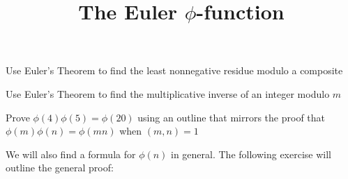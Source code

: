\documentclass{ximera}
\title{The Euler $\phi$-function}
\begin{document}
\begin{abstract}
\end{abstract}
\maketitle


\begin{obj}
\item Use Euler's Theorem to find the least nonnegative residue modulo a composite
\item Use Euler's Theorem to find the multiplicative inverse of an integer modulo $m$
\item Prove $\phi(4)\phi(5)=\phi(20)$ using an outline that mirrors the proof that $\phi(m)\phi(n)=\phi(mn)$ when $(m,n)=1$
\end{obj}


We will also find a formula for $\phi(n)$ in general. The following exercise will outline the general proof:
\end{document}
